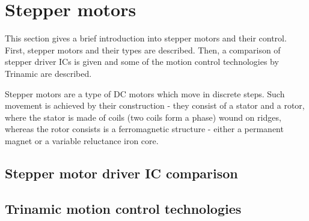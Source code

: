 \section{Stepper motors}
\label{sec:steppers}
This section gives a brief introduction into stepper motors and their control.
First, stepper motors and their types are described.
Then, a comparison of stepper driver ICs is given and some of the motion control technologies by Trinamic are described.

Stepper motors are a type of DC motors which move in discrete steps\cite{noauthor_all_nodate,noauthor_stepper_nodate}.
Such movement is achieved by their construction - they consist of a stator and a rotor, where the stator is made of coils
(two coils form a phase) wound on ridges, whereas the rotor consists is a ferromagnetic structure - either a permanent
magnet or a variable reluctance iron core\cite{noauthor_stepper_nodate}.




\subsection{Stepper motor driver IC comparison}
\label{subsec:stepper_ic}

\subsection{Trinamic motion control technologies}
\label{subsec:trinamic_tech}

